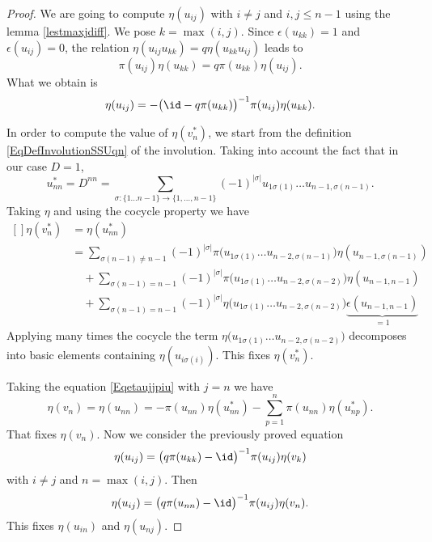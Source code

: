 \begin{proof}
    We are going to compute $\eta(u_{ij})$ with $i\neq j$ and $i,j\leq n-1$ using the lemma \ref{lestmaxjdiff}. We pose $k=\max(i,j)$. Since $\epsilon(u_{kk})=1$ and $\epsilon(u_{ij})=0$, the relation $\eta(u_{ij}u_{kk})=q\eta(u_{kk}u_{ij})$ leads to
    \begin{equation}
        \pi(u_{ij})\eta(u_{kk})=q\pi(u_{kk})\eta(u_{ij}).
    \end{equation}
    What we obtain is
    \begin{equation}
        \eta(u_{ij})=-\big( \id-q\pi(u_{kk}) \big)^{-1}\pi(u_{ij})\eta(u_{kk}).
    \end{equation}

    In order to compute the value of $\eta(v_n^*)$, we start from the definition \eqref{EqDefInvolutionSSUqn} of the involution. Taking into account the fact that in our case $D=1$,
    \begin{equation}
        u_{nn}^*=D^{nn}=\sum_{\sigma\colon \{ 1\ldots n-1 \}\to \{ 1,\ldots,n-1 \}}(-1)^{| \sigma |}u_{1\sigma(1)}\ldots u_{n-1,\sigma(n-1)}.
    \end{equation}
    Taking $\eta$ and using the cocycle property we have
    \begin{equation}
        \begin{aligned}[]
            \eta(v_n^*)&=\eta(u_{nn}^*)\\
            &=\sum_{\sigma(n-1)\neq n-1}(-1)^{| \sigma |}\pi\big( u_{1\sigma(1)}\ldots u_{n-2,\sigma(n-1)} \big)\eta(u_{n-1,\sigma(n-1)})\\
            &\quad+\sum_{\sigma(n-1)=n-1}(-1)^{| \sigma |}\pi\big( u_{1\sigma(1)}\ldots u_{n-2,\sigma(n-2)} \big)\eta(u_{n-1,n-1})\\
            &\quad+\sum_{\sigma(n-1)=n-1}(-1)^{| \sigma |}\eta\big( u_{1\sigma(1)}\ldots u_{n-2,\sigma(n-2)} \big)\underbrace{\epsilon(u_{n-1,n-1})}_{=1}
        \end{aligned}
    \end{equation}
    Applying many times the cocycle the term $\eta\big( u_{1\sigma(1)}\ldots u_{n-2,\sigma(n-2)} \big)$ decomposes into basic elements containing $\eta(u_{i\sigma(i)})$. This fixes $\eta(v_n^*)$.
   
    Taking the equation \eqref{Eqetaujjpiu} with $j=n$ we have 
    \begin{equation}
        \eta(v_n)=\eta(u_{nn})=-\pi(u_{nn})\eta(u_{nn}^*)-\sum_{p=1}^n\pi(u_{nn})\eta(u_{np}^*).
    \end{equation}
    That fixes $\eta(v_n)$. Now we consider the previously proved equation
    \begin{equation}
        \eta(u_{ij})=\big( q\pi(u_{kk})-\id \big)^{-1}\pi(u_{ij})\eta(v_k)
    \end{equation}
    with $i\neq j$ and $n=\max(i,j)$. Then
    \begin{equation}
        \eta(u_{ij})=\big( q\pi(u_{nn})-\id \big)^{-1}\pi(u_{ij})\eta(v_n).
    \end{equation}
    This fixes $\eta(u_{in})$ and $\eta(u_{nj})$.

\end{proof}


